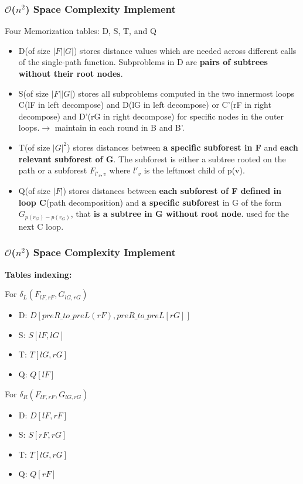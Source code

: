 \documentclass{beamer}
\begin{document}
\begin{frame}
\frametitle{$\mathcal{O}$($n^2$) Space Complexity Implement}
Four Memorization tables: D, S, T, and Q
\begin{itemize}
\item D(of size $\left\vert F\right\vert \left\vert G\right\vert$) stores distance values which are needed across different calls of the single-path function. Subproblems in D are \textbf{pairs of subtrees without their root nodes}.
\item S(of size $\left\vert F\right\vert \left\vert G\right\vert$) stores all subproblems computed in the two innermost loops C(lF in left decompose) and D(lG in left decompose) or C'(rF in right decompose) and D'(rG in right decompose) for specific nodes in the outer loops.$\to$ maintain in each round in B and B'.
\item T(of size $\left\vert G\right\vert^2$) stores distances between \textbf{a specific subforest in F} and \textbf{each relevant subforest of G}. The subforest is either a subtree rooted on the path or a subforest $F_{l'_v, v}$ where $l'_v$ is the leftmost child of p(v).
\item Q(of size $\left\vert F\right\vert$) stores distances between \textbf{each subforest of F defined in loop C}(path decomposition) and \textbf{a specific subforest} in G of the form $G_{p(r_G)-p(r_G)}$, that \textbf{is a subtree in G without root node}. used for the next C loop.
\end{itemize}

\end{frame}

\begin{frame}
\frametitle{$\mathcal{O}$($n^2$) Space Complexity Implement}
\textbf{Tables indexing:}

For $\delta_L(F_{lF, rF}, G_{lG, rG})$
\begin{itemize}
\item D: $D[preR\_to\_preL(rF), preR\_to\_preL[rG]]$
\item S: $S[lF, lG]$
\item T: $T[lG, rG]$
\item Q: $Q[lF]$ 
\end{itemize}

For $\delta_R(F_{lF, rF}, G_{lG, rG})$
\begin{itemize}
\item D: $D[lF, rF]$
\item S: $S[rF, rG]$
\item T: $T[lG, rG]$
\item Q: $Q[rF]$
\end{itemize}

\end{frame}
\end{document}
